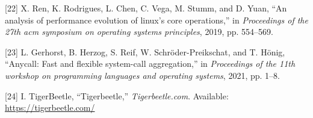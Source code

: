 \documentclass[conference]{IEEEtran}{}
\begin{document}
\begin{hangparas}{1.5em}{1}
\hypertarget{citeproc_bib_item_22}{[22] X. Ren, K. Rodrigues, L. Chen, C. Vega, M. Stumm, and D. Yuan, “An analysis of performance evolution of linux’s core operations,” in \textit{Proceedings of the 27th acm symposium on operating systems principles}, 2019, pp. 554–569.}

\hypertarget{citeproc_bib_item_23}{[23] L. Gerhorst, B. Herzog, S. Reif, W. Schröder-Preikschat, and T. Hönig, “Anycall: Fast and flexible system-call aggregation,” in \textit{Proceedings of the 11th workshop on programming languages and operating systems}, 2021, pp. 1–8.}

\hypertarget{citeproc_bib_item_24}{[24] I. TigerBeetle, “Tigerbeetle,” \textit{Tigerbeetle.com}. Available: \url{https://tigerbeetle.com/}}\bigskip
\end{hangparas}
\end{document}
